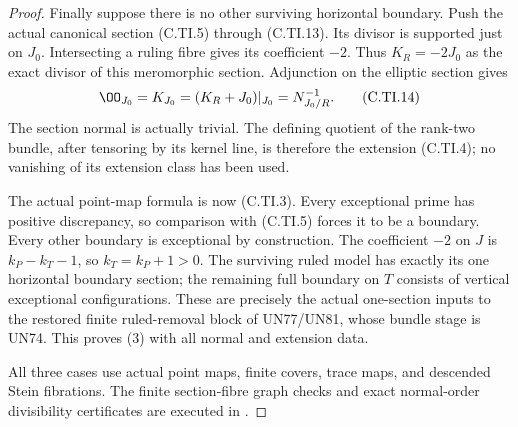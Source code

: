 \begin{proof}
Finally suppose there is no other
surviving horizontal boundary.
Push the actual canonical section
(C.TI.5) through (C.TI.13).
Its divisor is supported just on
\(J_0\). Intersecting a ruling
fibre gives its coefficient \(-2\).
Thus \(K_R=-2J_0\) as the exact
divisor of this meromorphic
section. Adjunction on the
elliptic section gives
\[
 \OO_{J_0}=K_{J_0}
          =(K_R+J_0)|_{J_0}=N_{J_0/R}^{-1}.
 \tag{C.TI.14}
\]
The section normal is actually
trivial. The defining quotient
of the rank-two bundle, after
tensoring by its kernel line,
is therefore the extension
(C.TI.4); no vanishing of its
extension class has been used.

The actual point-map formula is
now (C.TI.3). Every exceptional
prime has positive discrepancy,
so comparison with (C.TI.5)
forces it to be a boundary.
Every other boundary is
exceptional by construction.
The coefficient \(-2\) on \(J\)
is \(k_P-k_T-1\), so
\(k_T=k_P+1>0\). The surviving
ruled model has exactly its
one horizontal boundary section;
the remaining full boundary on
\(T\) consists of vertical
exceptional configurations.
These are precisely the actual
one-section inputs to the
restored finite ruled-removal
block of UN77/UN81, whose
bundle stage is UN74.
This proves (3) with all
normal and extension data.

All three cases use actual point
maps, finite covers, trace maps,
and descended Stein fibrations.
The finite section-fibre graph
checks and exact normal-order
divisibility certificates are
executed in
.
\end{proof}
